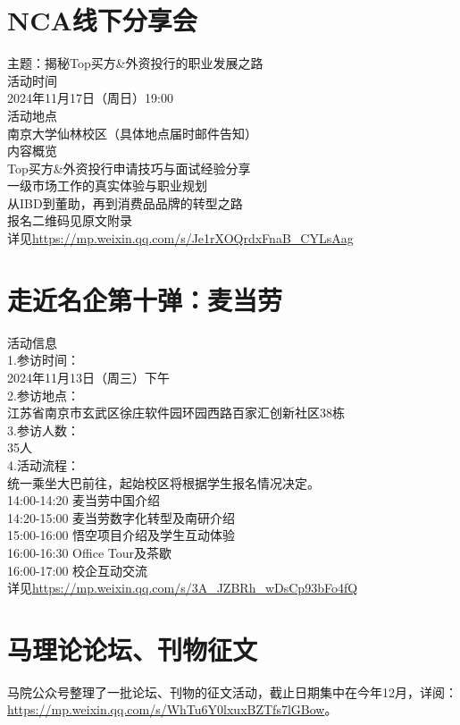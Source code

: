 \documentclass[letterpaper, 12pt]{article}
\begin{document}
\begin{multicols}{2}
\section{NCA线下分享会}
主题：揭秘Top买方&外资投行的职业发展之路\\
活动时间\\
2024年11月17日（周日）19:00\\
活动地点\\
南京大学仙林校区（具体地点届时邮件告知）\\
内容概览\\
Top买方&外资投行申请技巧与面试经验分享\\
一级市场工作的真实体验与职业规划\\
从IBD到董助，再到消费品品牌的转型之路\\
报名二维码见原文附录\\
详见\url{https://mp.weixin.qq.com/s/Je1rXOQrdxFnaB_CYLsAag}

\section{走近名企第十弹：麦当劳}
活动信息\\
1.参访时间：\\
2024年11月13日（周三）下午\\
2.参访地点：\\
江苏省南京市玄武区徐庄软件园环园西路百家汇创新社区38栋\\
3.参访人数：\\
35人\\
4.活动流程：\\
统一乘坐大巴前往，起始校区将根据学生报名情况决定。\\
14:00-14:20 麦当劳中国介绍\\
14:20-15:00 麦当劳数字化转型及南研介绍\\
15:00-16:00 悟空项目介绍及学生互动体验\\
16:00-16:30 Office Tour及茶歇\\
16:00-17:00 校企互动交流\\
详见\url{https://mp.weixin.qq.com/s/3A_JZBRh_wDsCp93bFo4fQ}\\

\section{马理论论坛、刊物征文}
马院公众号整理了一批论坛、刊物的征文活动，截止日期集中在今年12月，详阅：\url{https://mp.weixin.qq.com/s/WhTu6Y0lxuxBZTfs7lGBow}。




\end{multicols}
\end{document}
